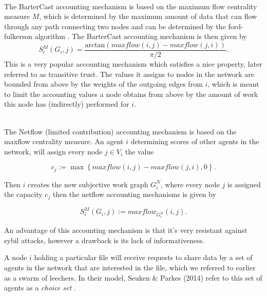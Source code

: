 \begin{example}\ \\
\label{ex:BarterCast Accounting Mechanism}
\noindent{}The BarterCast accounting mechanism is based on the maximum flow centrality measure $M$, which is determined by the maximum amount of data that can flow through any path connecting two nodes and can be determined by the ford-fulkerson algorithm \cite{Bartercast: A Practical Approach to Prevent Lazy Freeriding in P2P Networks}. The BarterCast accounting mechanism is then given by
\[
S^M_i(G_i,j)=\frac{\textrm{arctan}(maxflow(i,j)-maxflow(j,i))}{\pi/2}.
\]
\noindent{}This is a very popular accounting mechanism which satisfies a nice property, later referred to as transitive trust. The values it assigns to nodes in the network are bounded from above by the weights of the outgoing edges from $i$, which is meant to limit the accounting values a node obtains from above by the amount of work this node has (indirectly) performed for $i$.\vspace{1em}\\
\end{example}

\begin{example}\ \\
\label{ex:Netflow Accounting Mechanism}
\noindent{}The Netflow (limited contribution) accounting mechanism is based on the maxflow centrality measure. An agent $i$ determining scores of other agents in the network, will assign every node $j\in{}V_i$ the value 

\[
c_j:=\max\left\lbrace{}maxflow(i,j)-maxflow(j,i), 0\right\rbrace.
\]

\noindent{}Then $i$ creates the new subjective work graph $G_i^N$, where every node $j$ is assigned the capacity $c_j$ then the netflow accounting mechanisms is given by 

\[
S^M_i(G_i,j):=maxflow_{G_i^N}(i,j).
\]

\noindent{}An advantage of this accounting mechanism is that it's very resistant against sybil attacks, however a drawback is its lack of informativeness.\vspace{1em}\\
\end{example}

\noindent{}A node $i$ holding a particular file will receive requests to share data by a set of agents in the network that are interested in the file, which we referred to earlier as a swarm of leechers. In their model, Seuken \& Parkes (2014) refer to this set of agents as a {\it choice set} \cite{Sybil-proof Accounting Mechanisms with Transitive Trust}.\vspace{1em}\\

